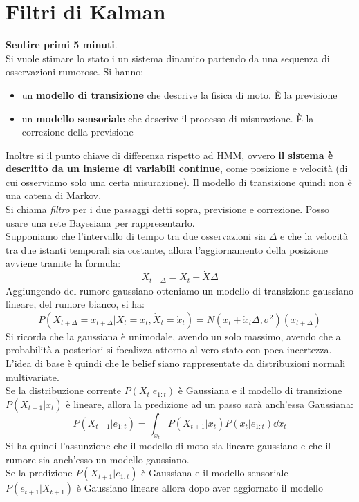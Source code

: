 \documentclass[a4paper,12pt, oneside]{book}
\begin{document}
\chapter{Filtri di Kalman}
\textbf{Sentire primi 5 minuti}.\\
Si vuole stimare lo stato i un sistema dinamico partendo da una sequenza di
osservazioni rumorose. Si hanno:
\begin{itemize}
  \item un \textbf{modello di transizione} che descrive la fisica di moto. È la
  previsione 
  \item un \textbf{modello sensoriale} che descrive il processo di
  misurazione. È la correzione della previsione
\end{itemize}
Inoltre si il punto chiave di differenza rispetto ad HMM, ovvero \textbf{il
  sistema è descritto da un insieme di variabili continue}, come posizione e
velocità (di cui osserviamo solo una certa misurazione). Il modello di
transizione quindi non è una catena di Markov.\\ 
Si chiama \textit{filtro} per i due passaggi detti sopra, previsione e
correzione. Posso usare una rete Bayesiana per rappresentarlo.\\
Supponiamo che l’intervallo di tempo tra due osservazioni sia $\Delta$ e che la
velocità tra due istanti temporali sia costante, allora l’aggiornamento della
posizione avviene tramite la formula:
\[X_{t+\Delta}=X_t+\dot{X}\Delta\]
Aggiungendo del rumore gaussiano otteniamo un modello di transizione gaussiano
lineare, del rumore bianco, si ha:
\[P(X_{t+\Delta}=x_{t+\Delta}|X_t=x_t,\dot{X}_t=\dot{x}_t)=
  N(x_t+\dot{x}_t\Delta,\sigma^2)(x_{t+\Delta})\]
Si ricorda che la gaussiana è unimodale, avendo un solo massimo, avendo che a
probabilità a posteriori si focalizza attorno al vero stato con poca
incertezza. \\
L'idea di base è quindi che le belief siano rappresentate da distribuzioni
normali multivariate.\\
Se la distribuzione corrente $P(X_t|e_{1:t})$ è Gaussiana e il modello di
transizione $P(X_{t+1}|x_{t})$ è lineare, allora la predizione ad un passo sarà
anch’essa Gaussiana:
\[P(X_{t+1}|e_{1:t})=\int_{x_t}P(X_{t+1}|x_t)P(x_t|e_{1:t})\dd{x_t}\]
Si ha quindi l'assunzione che il modello di moto sia lineare gaussiano e che il
rumore sia anch'esso un modello gaussiano.\\
Se la predizione $P(X_{t+1}|e_{1:t})$ è Gaussiana e il modello sensoriale
$P(e_{t+1}|X_{t+1})$ è Gaussiano lineare allora dopo aver aggiornato il modello
\end{document}
